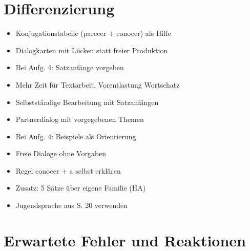 \documentclass[11pt,a4paper]{article}
\begin{document}
\section*{Differenzierung}

\begin{tcolorbox}[colback=green!5, colframe=basisgreen, title=\textbf{[B] Basis}]
\begin{itemize}
    \item Konjugationstabelle (parecer + conocer) als Hilfe
    \item Dialogkarten mit Lücken statt freier Produktion
    \item Bei Aufg. 4: Satzanfänge vorgeben
    \item Mehr Zeit für Textarbeit, Vorentlastung Wortschatz
\end{itemize}
\end{tcolorbox}

\begin{tcolorbox}[colback=blue!5, colframe=standardblue, title=\textbf{[S] Standard}]
\begin{itemize}
    \item Selbstständige Bearbeitung mit Satzanfängen
    \item Partnerdialog mit vorgegebenen Themen
    \item Bei Aufg. 4: Beispiele als Orientierung
\end{itemize}
\end{tcolorbox}

\begin{tcolorbox}[colback=purple!5, colframe=erweiterungpurple, title=\textbf{[E] Erweiterung}]
\begin{itemize}
    \item Freie Dialoge ohne Vorgaben
    \item Regel conocer + a selbst erklären
    \item Zusatz: 5 Sätze über eigene Familie (HA)
    \item Jugendsprache aus S. 20 verwenden
\end{itemize}
\end{tcolorbox}

\section*{Erwartete Fehler und Reaktionen}
\end{document}
